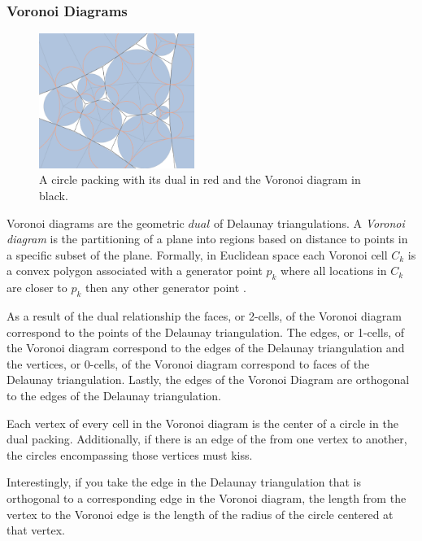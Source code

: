 \documentclass[11pt]{article}
\theoremstyle{definition}
\begin{document}
\subsubsection{Voronoi Diagrams}

	\begin{figure}
  		\begin{center}
    		\includegraphics[scale=.18,width=0.45\textwidth]{voronoi}
  		\end{center}
  		\caption{A circle packing with its dual in red and the Voronoi diagram in black.}
	\end{figure}

	Voronoi diagrams are the geometric $dual$ of Delaunay triangulations. 
	A \emph{Voronoi diagram} is the partitioning of a plane into regions based on distance to points in a specific subset of the plane. 
	Formally, in Euclidean space each Voronoi cell $C_k$ is a convex polygon associated with a generator point $p_k$ where all locations in $C_k$ are closer to $p_k$ then any other generator point \cite{voronoiDiagrams}. 

	As a result of the dual relationship the faces, or 2-cells, of the Voronoi diagram correspond to the points of the Delaunay triangulation. 
	The edges, or 1-cells, of the Voronoi diagram correspond to the edges of the Delaunay triangulation and the vertices, or 0-cells, of the Voronoi diagram correspond to faces of the Delaunay triangulation.
	Lastly, the edges of the Voronoi Diagram are orthogonal to the edges of the Delaunay triangulation. 

	Each vertex of every cell in the Voronoi diagram is the center of a circle in the dual packing. 
	Additionally, if there is an edge of the from one vertex to another, the circles encompassing those vertices must kiss. 
	
	Interestingly, if you take the edge in the Delaunay triangulation that is orthogonal to a corresponding edge in the Voronoi diagram, the length from the vertex to the Voronoi edge is the length of the radius of the circle centered at that vertex.
\end{document}

